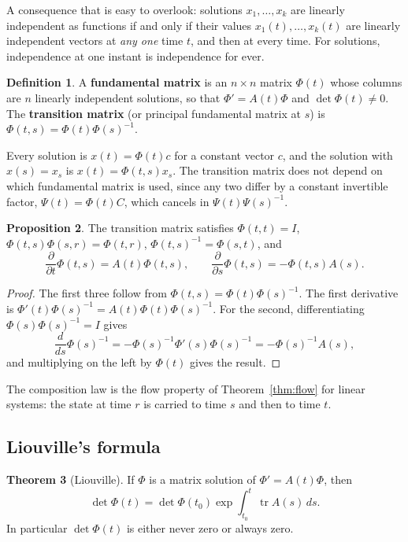 \documentclass[11pt,a4paper]{article}
\numberwithin{equation}{section}
\DeclareMathOperator{\tr}{tr}
\theoremstyle{definition}
\newtheorem{thm}{Theorem}[subsection]
\newtheorem{defn}[thm]{Definition}
\newtheorem{prop}[thm]{Proposition}
\begin{document}
A consequence that is easy to overlook: solutions $x_1, \dots, x_k$ are linearly independent as functions if and only if their values $x_1(t), \dots, x_k(t)$ are linearly independent
vectors at \emph{any one} time $t$, and then at every time. For solutions, independence at one instant is independence for ever.

\begin{defn}
A \textbf{fundamental matrix} is an $n \times n$ matrix $\Phi(t)$ whose columns are $n$ linearly independent solutions, so that $\Phi' = A(t)\Phi$ and $\det\Phi(t) \neq 0$. The \textbf{transition
matrix} (or principal fundamental matrix at $s$) is $\Phi(t, s) = \Phi(t)\Phi(s)^{-1}$.
\end{defn}

Every solution is $x(t) = \Phi(t)c$ for a constant vector $c$, and the solution with $x(s) = x_s$ is $x(t) = \Phi(t, s)x_s$. The transition matrix does not depend on which fundamental matrix
is used, since any two differ by a constant invertible factor, $\Psi(t) = \Phi(t)C$, which cancels in $\Psi(t)\Psi(s)^{-1}$.

\begin{prop}
\label{prop:transition}
The transition matrix satisfies $\Phi(t, t) = I$, $\Phi(t, s)\Phi(s, r) = \Phi(t, r)$, $\Phi(t, s)^{-1} = \Phi(s, t)$, and
\[
\frac{\partial}{\partial t}\Phi(t, s) = A(t)\Phi(t, s), \qquad \frac{\partial}{\partial s}\Phi(t, s) = -\Phi(t, s)A(s) .
\]
\end{prop}

\begin{proof}
The first three follow from $\Phi(t, s) = \Phi(t)\Phi(s)^{-1}$. The first derivative is $\Phi'(t)\Phi(s)^{-1} = A(t)\Phi(t)\Phi(s)^{-1}$. For the second, differentiating
$\Phi(s)\Phi(s)^{-1} = I$ gives
\[
\frac{d}{ds}\Phi(s)^{-1} = -\Phi(s)^{-1}\Phi'(s)\Phi(s)^{-1} = -\Phi(s)^{-1}A(s) ,
\]
and multiplying on the left by $\Phi(t)$ gives the result.
\end{proof}

The composition law is the flow property of Theorem~\ref{thm:flow} for linear systems: the state at time $r$ is carried to time $s$ and then to time $t$.

\subsection{Liouville's formula}
\label{ssec:liouville}

\begin{thm}[Liouville]
\label{thm:liouville}
If $\Phi$ is a matrix solution of $\Phi' = A(t)\Phi$, then
\[
\det\Phi(t) = \det\Phi(t_0)\exp\int_{t_0}^t\tr A(s)\,ds .
\]
In particular $\det\Phi(t)$ is either never zero or always zero.
\end{thm}
\end{document}
